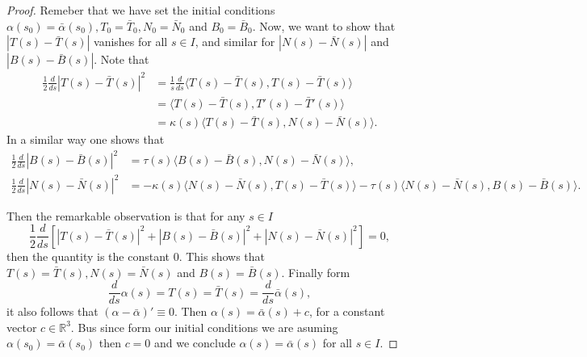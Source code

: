 \documentclass{amsart}
\begin{document}
\begin{proof}
Remeber that we have set the initial conditions \(\alpha(s_0) = \bar{\alpha}(s_0), T_0 = \bar{T}_0, N_0 = \bar{N}_0\) and \(B_0 = \bar{B}_0\).
Now, we want to show that \(|T(s) - \bar{T}(s)|\) vanishes for all \(s\in I\), and similar for \(|N(s) - \bar{N}(s)|\) and \(|B(s) - \bar{B}(s)|\). Note that
\begin{align*}
 \frac{1}{2}\frac{d}{ds} |T(s) - \bar{T}(s)|^2 & = \frac{1}{s}\frac{d}{ds} \langle T(s) - \bar{T}(s), T(s) - \bar{T}(s) \rangle \\ 
& = \langle T(s) - \bar{T}(s), T'(s) - \bar{T}'(s) \rangle \\
& = \kappa(s) \langle T(s) - \bar{T}(s), N(s) - \bar{N}(s) \rangle.
\end{align*}
In a similar way one shows that
\begin{align*}
\frac{1}{2}\frac{d}{ds} |B(s) - \bar{B}(s)|^2 &= \tau(s) \langle B(s) - \bar{B}(s), N(s) - \bar{N}(s) \rangle, \\
\frac{1}{2}\frac{d}{ds} |N(s) - \bar{N}(s)|^2 &= -\kappa(s) \langle N(s) - \bar{N}(s), T(s) - \bar{T}(s) \rangle  -\tau(s) \langle N(s) - \bar{N}(s), B(s) - \bar{B}(s) \rangle.
\end{align*}

Then the remarkable observation is that for any \(s\in I\)
\[ \frac{1}{2}\frac{d}{ds}\left[ |T(s) - \bar{T}(s)|^2 + |B(s) - \bar{B}(s)|^2 + |N(s) - \bar{N}(s)|^2 \right] = 0, \]
then the quantity is the constant \(0\). This shows that \(T(s) = \bar{T}(s), N(s) = \bar{N}(s)\) and \(B(s) = \bar{B}(s)\).
Finally  form
\[ \frac{d}{ds} \alpha(s) = T(s) = \bar{T}(s) = \frac{d}{ds} \bar{\alpha}(s), \]
it also follows that \((\alpha - \bar{\alpha})' \equiv 0\). Then \(\alpha(s) = \bar{\alpha}(s) + c\), for a constant vector \(c\in \mathbb{R}^3\). Bus since form our initial conditions
we are asuming \(\alpha(s_0) = \bar{\alpha}(s_0)\) then \(c=0\) and we conclude \(\alpha(s) = \bar{\alpha}(s)\) for all \(s\in I\).
\end{proof}
\end{document}
